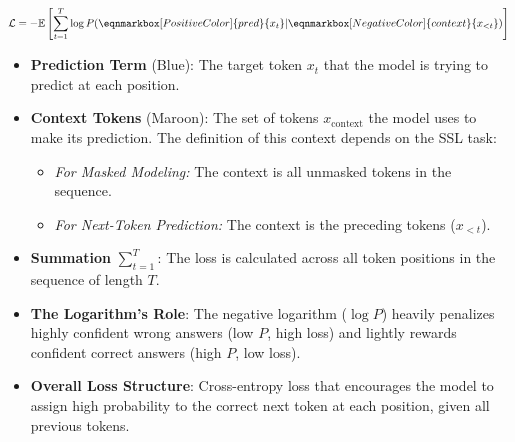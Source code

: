 \begin{tcolorbox}[
    title= Cross-Entropy Loss,
    breakable,
    enhanced,
    colback=white,
    colframe=black!30,
    colbacktitle=black!10,
    coltitle=black,
    fonttitle=\bfseries,
    boxrule=0.5mm,
    left=2mm,
    right=2mm,
    top=4mm,
    bottom=4mm,
    middle=10mm
]
\label{eq:nexttoken}
\begin{center}
\begin{minipage}{0.9\linewidth}
\begin{equation}
\mathcal{L} = 
-\mathbb{E} \left[ \sum_{t=1}^{T} 
\log P(\eqnmarkbox[PositiveColor]{pred}{x_t} | \eqnmarkbox[NegativeColor]{context}{x_{<t}})
\right]
\label{eq:cross_entropy}
\end{equation}
\end{minipage}
\end{center}
\tcblower
\begin{itemize}
\item \textbf{Prediction Term} ({\color{PositiveColor}Blue}): The target token $x_t$ that the model is trying to predict at each position.
\item \textbf{Context Tokens} ({\color{NegativeColor}Maroon}): The set of tokens $x_{\text{context}}$ the model uses to make its prediction. The definition of this context depends on the SSL task:
            \begin{itemize}
                \item \textit{For Masked Modeling:} The context is all unmasked tokens in the sequence.
                \item \textit{For Next-Token Prediction:} The context is the preceding tokens ($x_{<t}$).     
            \end{itemize}
\item \textbf{Summation} $\sum_{t=1}^{T}$: The loss is calculated across all token positions in the sequence of length $T$.
\item \textbf{The Logarithm's Role}: The negative logarithm ($\log P$) heavily penalizes highly confident wrong answers (low $P$, high loss) and lightly rewards confident correct answers (high $P$, low loss).
\item \textbf{Overall Loss Structure}: Cross-entropy loss that encourages the model to assign high probability to the correct next token at each position, given all previous tokens.
\end{itemize}
\end{tcolorbox}


